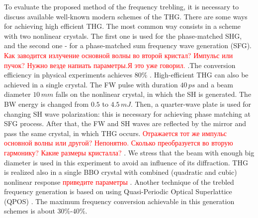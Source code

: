\documentclass[a4paper, 12pt, onecolumn]{extarticle}
\begin{document}
To evaluate the proposed method of the frequency trebling, it is necessary to discuss available  well-known modern schemes of the THG. There are some ways for achieving  high efficient THG. The most common way consists in a scheme with two nonlinear crystals. The first one is used for the phase-matched SHG, and the second one -  for a phase-matched sum frequency wave generation (SFG).\textcolor{red}{   Как заводится излучение основной волны во второй кристал? Импульс или пучок? Нужно везде напиать параметры.Я это уже говорил.  }.The conversion efficiency in physical experiments achieves  $80\%$ \cite{bib:t4a,bib:t4}.   High-efficient THG can also be achieved in a single crystal.  The FW pulse with duration  $40\,ps$ and a beam  diameter $10\,mm$ falls on the nonlinear crystal, in which the SH is generated. The BW energy is changed  from $0.5$ to $4.5\,mJ$. Then, a quarter-wave plate is used for changing SH wave polarization: this is necessary for achieving  phase matching at SFG process. After that, the  FW and SH waves are reflected by the mirror and pass the same crystal, in which THG occurs.   \textcolor{red}{Отражается тот же импульс основной волны или другой? Непонятно. Сколько преобразуется во вторую гармонику? Какие размеры кристалла? }. We stress that the beam with enough big diameter is used in this experiment to avoid an influence of its diffraction.  THG is realized also in a single BBO crystal with combined (quadratic and cubic) nonlinear response \textcolor{red}{приведите параметры} \cite{bib:t1}. Another technique of the trebled frequency  generation is based on using Quasi-Periodic Optical Superlattice (QPOS) \cite{bib:t2}.   The maximum frequency conversion achievable in this generation schemes is about $30\%$-$40\%$.
\end{document}
